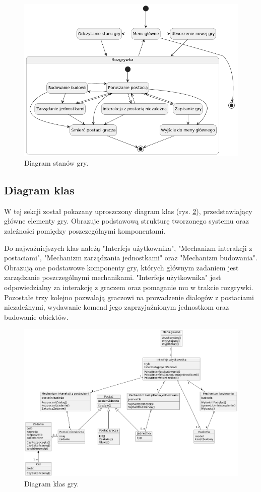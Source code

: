 \begin{figure}[!htbp]
    \centering
    \includegraphics[width=1.0\textwidth]{images/diagrams/state.jpg}
    \caption{Diagram stanów gry.}\label{fig:states_d}
\end{figure}
\FloatBarrier

\subsection{Diagram klas}\label{ss:class}
W tej sekcji został pokazany uproszczony diagram klas (rys. \ref{fig:classes_d}), przedstawiający główne elementy gry.
Obrazuje podstawową strukturę tworzonego systemu oraz zależności pomiędzy poszczególnymi komponentami.

Do najważniejszych klas należą "Interfejs użytkownika", "Mechanizm interakcji z postaciami", "Mechanizm zarządzania
jednostkami" oraz "Mechanizm budowania". Obrazują one podstawowe komponenty gry, których głównym zadaniem jest zarządzanie
poszczególnymi mechanikami. "Interfejs użytkownika" jest odpowiedzialny za interakcję z graczem oraz pomaganie mu w
trakcie rozgrywki. Pozostałe trzy kolejno pozwalają graczowi na prowadzenie dialogów z postaciami
niezależnymi, wydawanie komend jego zaprzyjaźnionym jednostkom oraz budowanie obiektów.
\begin{figure}[!htbp]
    \centering
    \includegraphics[width=1.0\textwidth]{images/diagrams/class.jpg}
    \caption{Diagram klas gry.}\label{fig:classes_d}
\end{figure}
